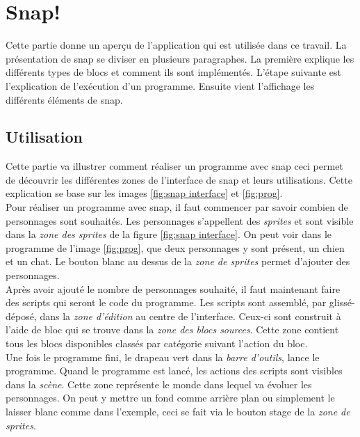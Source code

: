 \section{Snap!}
Cette partie donne un aperçu de l'application qui est utilisée dans ce travail. La présentation de \gls{snap} \cite{snap} se diviser en plusieurs paragraphes. La première explique les différents types de blocs et comment ils sont implémentés. L'étape suivante est l'explication de l'exécution d'un programme. Ensuite vient l'affichage les différents éléments de \gls{snap}. %

\subsection{Utilisation}
Cette partie va illustrer comment réaliser un programme avec \gls{snap} ceci permet de découvrir les différentes zones de l'interface de \gls{snap} et leurs utilisations. Cette explication se base sur les images \ref{fig:snap interface} et \ref{fig:prog}.\\

Pour réaliser un programme avec \gls{snap}, il faut commencer par savoir combien de personnages sont souhaités. Les personnages s'appellent des \textit{sprites} et sont visible dans la \textit{zone des sprites} de la figure \ref{fig:snap interface}. On peut voir dans le programme de l'image \ref{fig:prog}, que deux personnages y sont présent, un chien et un chat. Le bouton blanc au dessus de la \textit{zone de sprites} permet d'ajouter des personnages.\\

Après avoir ajouté le nombre de personnages souhaité, il faut maintenant faire des scripts qui seront le code du programme. Les scripts sont assemblé, par glissé-déposé, dans la \textit{zone d'édition} au centre de l'interface. Ceux-ci sont construit à l'aide de bloc qui se trouve dans la \textit{zone des blocs sources}. Cette zone contient tous les blocs disponibles classés par catégorie suivant l'action du bloc.\\

Une fois le programme fini, le drapeau vert dans la \textit{barre d'outils}, lance le programme. Quand le programme est lancé, les actions des scripts sont visibles dans la \textit{scène}. Cette zone représente le monde dans lequel va évoluer les personnages. On peut y mettre un fond comme arrière plan ou simplement le laisser blanc comme dans l'exemple, ceci se fait via le bouton stage de la \textit{zone de sprites}.
